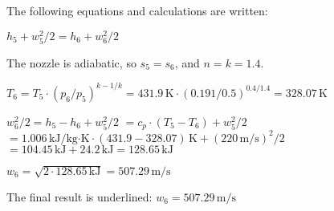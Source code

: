The following equations and calculations are written:  

\( h_5 + w_5^2 / 2 = h_6 + w_6^2 / 2 \)  

The nozzle is adiabatic, so \( s_5 = s_6 \), and \( n = k = 1.4 \).  

\( T_6 = T_5 \cdot (p_6 / p_5)^{k-1/k} = 431.9 \, \text{K} \cdot (0.191 / 0.5)^{0.4/1.4} = 328.07 \, \text{K} \)  

\( w_6^2 / 2 = h_5 - h_6 + w_5^2 / 2 \)  
\( = c_p \cdot (T_5 - T_6) + w_5^2 / 2 \)  
\( = 1.006 \, \text{kJ/kg·K} \cdot (431.9 - 328.07) \, \text{K} + (220 \, \text{m/s})^2 / 2 \)  
\( = 104.45 \, \text{kJ} + 24.2 \, \text{kJ} = 128.65 \, \text{kJ} \)  

\( w_6 = \sqrt{2 \cdot 128.65 \, \text{kJ}} = 507.29 \, \text{m/s} \)  

The final result is underlined:  
\( w_6 = 507.29 \, \text{m/s} \)